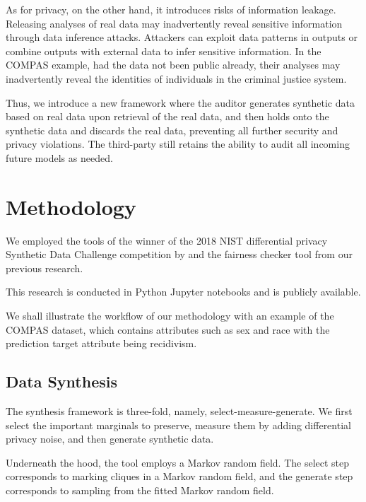 \documentclass[manuscript,screen,review,anonymous]{acmart}
\begin{document}
As for privacy, on the other hand, it introduces risks of information leakage. Releasing analyses of real data may inadvertently reveal sensitive information through data inference attacks. Attackers can exploit data patterns in outputs or combine outputs with external data to infer sensitive information. In the COMPAS example, had the data not been public already, their analyses may inadvertently reveal the identities of individuals in the criminal justice system.

Thus, we introduce a new framework where the auditor generates synthetic data based on real data upon retrieval of the real data, and then holds onto the synthetic data and discards the real data, preventing all further security and privacy violations. The third-party still retains the ability to audit all incoming future models as needed.

\section{Methodology}
\label{sec:method}

We employed the tools of the winner of the 2018 NIST differential privacy Synthetic Data Challenge competition\cite{NIST2018} by \cite{nist_ryan_2018,McKenna_private-PGM_2021,mckenna2021winning,mckenna2019graphical} and the fairness checker tool from our previous research\cite{yuan2024ensuring}.

This research is conducted in Python Jupyter notebooks and is publicly available.

We shall illustrate the workflow of our methodology with an example of the COMPAS dataset, which contains attributes such as sex and race with the prediction target attribute being recidivism.

\subsection{Data Synthesis}

The synthesis framework is three-fold, namely, select-measure-generate\cite{McKenna2022,YouTube_Differentially_Private_Synthetic_Data}. We first select the important marginals to preserve, measure them by adding differential privacy noise, and then generate synthetic data.

Underneath the hood, the tool employs a Markov random field. The select step corresponds to marking cliques in a Markov random field, and the generate step corresponds to sampling from the fitted Markov random field.
\end{document}
